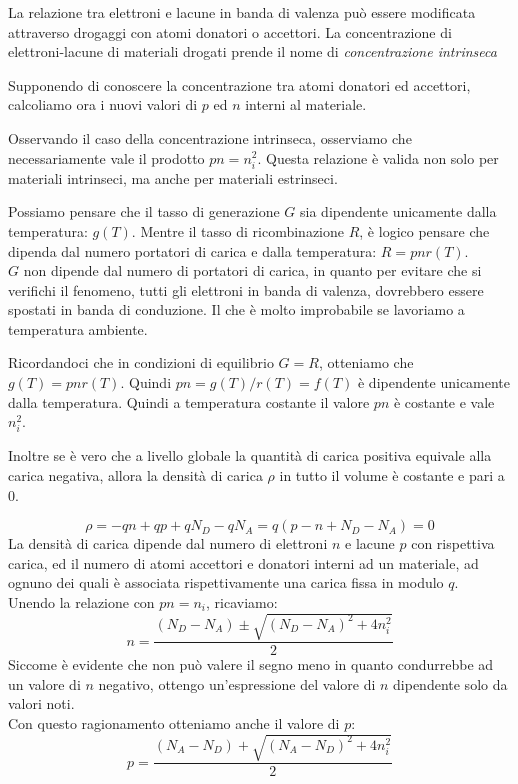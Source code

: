 \documentclass[../template]{subfiles}
\begin{document}
La relazione tra elettroni e lacune in banda di valenza può essere modificata attraverso drogaggi con atomi donatori o accettori. La concentrazione di elettroni-lacune di materiali drogati prende il nome di \textit{concentrazione intrinseca}

Supponendo di conoscere la concentrazione tra atomi donatori ed accettori, calcoliamo ora i nuovi valori di $p$ ed $n$ interni al materiale.

Osservando il caso della concentrazione intrinseca, osserviamo che necessariamente vale il prodotto $pn = n_i^2$. Questa relazione è valida non solo per materiali intrinseci, ma anche per materiali estrinseci.

Possiamo pensare che il tasso di generazione $G$ sia dipendente unicamente dalla temperatura: $g(T)$.
Mentre il tasso di ricombinazione $R$, è logico pensare che dipenda dal numero portatori di carica e dalla temperatura: $R = pnr(T)$.
\\
$G$ non dipende dal numero di portatori di carica, in quanto per evitare che si verifichi il fenomeno,
tutti gli elettroni in banda di valenza, dovrebbero essere spostati in banda di conduzione. Il che è molto improbabile se
lavoriamo a temperatura ambiente.

Ricordandoci che in condizioni di equilibrio $G = R$, otteniamo che $g(T) = pnr(T)$. Quindi $pn = g(T)/r(T) = f(T)$ è dipendente unicamente dalla temperatura. Quindi a temperatura costante il valore $pn$ è costante e vale $n_i^2$.

Inoltre se è vero che a livello globale la quantità di carica positiva equivale alla carica negativa, allora la densità di carica $\rho$ in tutto il volume è costante e pari a $0$.

\[
    \rho = -q n + qp  + qN_D -q N_A = q (p -n + N_D - N_A) = 0
\]
La densità di carica dipende dal numero di elettroni $n$ e lacune $p$ con rispettiva carica, ed il numero di atomi accettori e donatori interni ad un materiale, ad ognuno dei quali è associata rispettivamente una carica fissa in modulo $q$.
\\
Unendo la relazione con $pn = n_i$, ricaviamo:
\[
    n = \frac{(N_D - N_A) \pm \sqrt{(N_D - N_A)^2 + 4 n_i^2}}{2}
\]
Siccome è evidente che non può valere il segno meno in quanto condurrebbe ad un valore di $n$ negativo, ottengo un'espressione del valore di $n$ dipendente solo da valori noti.
\\
Con questo ragionamento otteniamo anche il valore di $p$:
\[
    p = \frac{(N_A - N_D) + \sqrt{(N_A - N_D)^2 + 4 n_i^2}}{2}
\]
\end{document}
